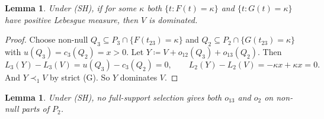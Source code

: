 \documentclass[11pt]{article}
\newtheorem{lemma}[theorem]{Lemma}
\theoremstyle{definition}\newtheorem{definition}[theorem]{Definition}
\theoremstyle{remark}\newtheorem{remark}[theorem]{Remark}
\begin{document}
\begin{lemma}\label{lem:tied}
Under (SH), if for some $\kappa$ both $\{t:F(t)=\kappa\}$ and
$\{t:G(t)=\kappa\}$ have positive Lebesgue measure, then $V$ is dominated.
\end{lemma}
\begin{proof}
Choose non-null $Q_3\subseteq P_3\cap\{F(t_{23})=\kappa\}$ and
$Q_2\subseteq P_2\cap\{G(t_{23})=\kappa\}$ with $u(Q_3)=c_3(Q_2)=x>0$. Let
$Y\coloneqq V+o_{12}(Q_3)+o_{13}(Q_2)$. Then
\[
 L_3(Y)-L_3(V)=u(Q_3)-c_3(Q_2)=0,\qquad
 L_2(Y)-L_2(V)=-\kappa x+\kappa x=0.
\]
And $Y\prec_1V$ by strict (G). So $Y$ dominates $V$.
\end{proof}

\begin{lemma}\label{lem:noboth}
Under (SH), no full-support selection gives both $o_{13}$ and $o_2$ on non-null
parts of $P_2$.
\end{lemma}
\end{document}
